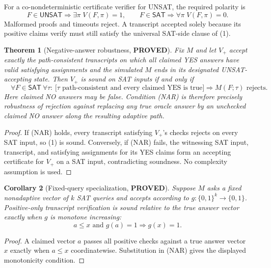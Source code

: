 \documentclass[11pt]{article}
\newtheorem{theorem}{Theorem}
\newtheorem{corollary}[theorem]{Corollary}
\newcommand{\status}[1]{\textbf{#1}}
\newcommand{\SAT}{\mathsf{SAT}}
\newcommand{\UNSAT}{\mathsf{UNSAT}}
\begin{document}
For a co-nondeterministic certificate verifier for UNSAT, the required
polarity is
\[
 F\in\UNSAT\Rightarrow\exists\pi\;V(F,\pi)=1,
 \qquad
 F\in\SAT\Rightarrow\forall\pi\;V(F,\pi)=0.                 \tag{1}
\]
Malformed proofs and timeouts reject.  A transcript accepted solely because
its positive claims verify must still satisfy the universal SAT-side clause of
(1).

\begin{theorem}[Negative-answer robustness, \status{PROVED}]
Fix $M$ and let $V_+$ accept exactly the path-consistent transcripts on which
all claimed YES answers have valid satisfying assignments and the simulated
$M$ ends in its designated UNSAT-accepting state.  Then $V_+$ is sound on SAT
inputs if and only if
\[
 \boxed{\quad
 \forall F\in\SAT\ \forall\tau:\
 \bigl[\tau\text{ path-consistent and every claimed YES is true}\bigr]
 \Longrightarrow M(F;\tau)\text{ rejects}.
 \quad}                                                     \tag{NAR}
\]
Here claimed NO answers may be false.  Condition (NAR) is therefore precisely
robustness of rejection against replacing any true oracle answer by an
unchecked claimed NO answer along the resulting adaptive path.
\end{theorem}
\begin{proof}
If (NAR) holds, every transcript satisfying $V_+$'s checks rejects on every SAT
input, so (1) is sound.  Conversely, if (NAR) fails, the witnessing SAT input,
transcript, and satisfying assignments for its YES claims form an accepting
certificate for $V_+$ on a SAT input, contradicting soundness.  No complexity
assumption is used.
\end{proof}

\begin{corollary}[Fixed-query specialization, \status{PROVED}]
Suppose $M$ asks a fixed nonadaptive vector of $k$ SAT queries and accepts
according to $g:\{0,1\}^k\to\{0,1\}$.  Positive-only transcript verification
is sound relative to the true answer vector exactly when $g$ is monotone
increasing:
\[
                 a\le x\text{ and }g(a)=1\Longrightarrow g(x)=1.
\]
\end{corollary}
\begin{proof}
A claimed vector $a$ passes all positive checks against a true answer vector
$x$ exactly when $a\le x$ coordinatewise.  Substitution in (NAR) gives the
displayed monotonicity condition.
\end{proof}
\end{document}
